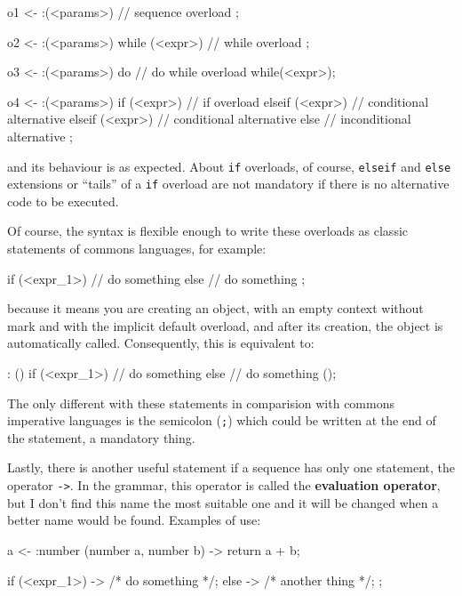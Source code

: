 \documentclass{article}
\begin{document}
\begin{faupp2}
   o1 <- :(<params>) {
          // sequence overload
         };

   o2 <- :(<params>)
         while (<expr>) {
           // while overload
         };

   o3 <- :(<params>)
         do {
           // do while overload
         } while(<expr>);

   o4 <- :(<params>)
         if (<expr>) {
           // if overload
         } elseif (<expr>) {
           // conditional alternative
         } elseif (<expr>) {
           // conditional alternative
         } else {
           // inconditional alternative
         };
\end{faupp2}

and its behaviour is as expected. About \texttt{if} overloads, of course,
\texttt{elseif} and \texttt{else} extensions or ``tails'' of a \texttt{if}
overload are not mandatory if there is no alternative code to be executed.

Of course, the \faupp syntax is flexible enough to write these overloads as
classic statements of commons languages, for example:

\begin{faupp2}
  if (<expr_1>) {
    // do something
  }
  else {
    // do something
  };
\end{faupp2}

because it means you are creating an object, with an empty context without
mark and with the implicit default overload, and after its creation, the object
is automatically called. Consequently, this is equivalent to:

\begin{faupp2}
  [] : ()
  if (<expr_1>) {
    // do something
  }
  else {
    // do something
  }();
\end{faupp2}

The only different with these statements in comparision with commons imperative
languages is the semicolon (\texttt{;}) which could be written at the end of the
statement, a mandatory thing.

Lastly, there is another useful statement if a sequence has only one statement,
the operator \texttt{->}. In the \faupp grammar, this operator is called the
\textbf{evaluation operator}, but I don't find this name the most suitable one
and it will be changed when a better name would be found. Examples of use:

\begin{faupp2}
  a <- :number (number a, number b)
            -> return a + b;

  if (<expr_1>)
    -> /* do something */;
  else
    -> /* another thing */;
  ;

\end{faupp2}
\end{document}
